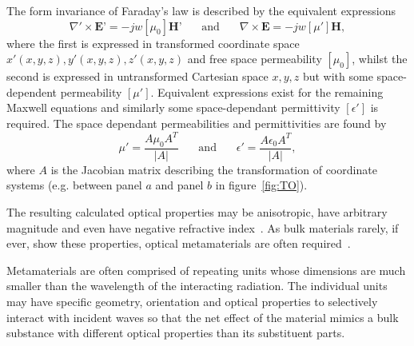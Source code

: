 \documentclass[11pt]{iopart}
\begin{document}
The form invariance of Faraday's law is
described by the equivalent expressions
\vspace{-0.2em}
\begin{equation}
  \label{ME1}
  \nabla'\times \textbf{E'} = -jw[\mu_0]\textbf{H'}
  ~~~~~~~~\text{and}~~~~~~~~
  \nabla\times \textbf{E} = -jw[\mu']\textbf{H},
\end{equation}
\vspace{-0.2em}
where the first is expressed in transformed coordinate space $x'(x, y,
z), y'(x, y, z), z'(x, y, z)$ and free space permeability $[\mu_0]$,
whilst the second is expressed in untransformed Cartesian space $x, y,
z$ but with some space-dependent permeability $[\mu']$.  Equivalent
expressions exist for the remaining Maxwell equations and similarly
some space-dependant permittivity $[\epsilon']$ is required. The space
dependant permeabilities and permittivities are found by
\vspace{-0.2em}
\begin{equation}
  \label{eqn:J}
  \mu'=\frac{A\mu_0 A^T}{|A|}
  ~~~~~~~~\text{and}~~~~~~~~
  \epsilon'=\frac{A\epsilon_0 A^T}{|A|},
\end{equation}
\vspace{-0.2em}
where $A$ is the Jacobian matrix describing the transformation of
coordinate systems (e.g. between panel $a$ and panel $b$ in
figure~\ref{fig:TO}). 

The resulting calculated optical properties
may be anisotropic, have arbitrary magnitude and even have
negative refractive index~\cite{Pendry2000}. As bulk materials rarely, if ever, show these
properties, optical metamaterials are often
required~\cite{Smith2004}. 

Metamaterials are often comprised of
repeating units whose dimensions are much smaller than the wavelength
of the interacting radiation. The individual units may
have specific geometry, orientation and optical properties to
selectively interact with incident waves so that the net effect of the
material mimics a bulk substance with different optical properties
than its substituent parts.
\end{document}
